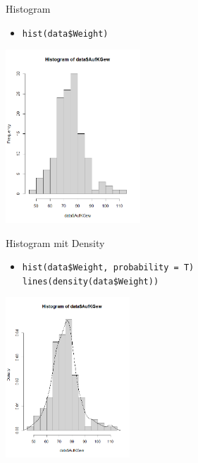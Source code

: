 \documentclass[xcolor=dvipsnames, aspectratio = 169]{beamer}
\begin{document}
\begin{frame}[fragile]{Histogram}
	\begin{itemize}
		\item \verb+hist(data$Weight)+
	\end{itemize}
			
	\begin{center}
		\includegraphics[height=6.5cm]{Histogram}
	\end{center}
\end{frame}

\begin{frame}[fragile]{Histogram mit Density}
	\begin{itemize}
		\item \verb+hist(data$Weight, probability = T) + \\ \verb +lines(density(data$Weight))+
	\end{itemize}
			
	\begin{center}
		\includegraphics[height=6cm]{Density}
	\end{center}
\end{frame}
\end{document}
